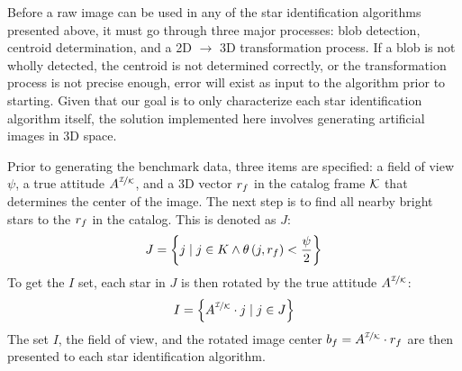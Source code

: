 Before a raw image can be used in any of the star identification algorithms presented above, it must go through
three major processes: blob detection, centroid determination, and a 2D $\rightarrow$ 3D transformation process.
If a blob is not wholly detected, the centroid is not determined correctly, or the transformation process
is not precise enough, error will exist as input to the algorithm prior to starting.
Given that our goal is to only characterize each star identification algorithm itself, the solution implemented here
involves generating artificial images in 3D space.

Prior to generating the benchmark data, three items are specified: a field of view $\psi$, a true attitude
$A^{\nicefrac{\mathcal{I}}{\mathcal{K}}}$, and a 3D vector $r_f$ in the catalog frame $\mathcal{K}$ that determines
the center of the image.
The next step is to find all nearby bright stars to the $r_f$ in the catalog.
This is denoted as $J$:
\begin{equation}
    J = \left\{  j \mid j \in K \land \theta\left( j, r_f \right) < \frac{\psi}{2}  \right\}
\end{equation}
To get the $I$ set, each star in $J$ is then rotated by the true attitude $A^{\nicefrac{\mathcal{I}}{\mathcal{K}}}$:
\begin{equation}
    I = \left\{  A^{\nicefrac{\mathcal{I}}{\mathcal{K}}} \cdot j \mid j \in J  \right\}
\end{equation}
The set $I$, the field of view, and the rotated image center $b_f = A^{\nicefrac{\mathcal{I}}{\mathcal{K}}} \cdot r_f$
are then presented to each star identification algorithm.

